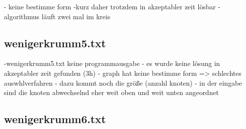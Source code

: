 \documentclass[a4paper,10pt,ngerman]{scrartcl}
\begin{document}
    - keine bestimme form
    -kurz daher trotzdem in akzeptabler zeit lösbar
    - algorithmus läuft zwei mal im kreis

    \subsection{wenigerkrumm5.txt}\label{subsec:wenigerkrumm5.txt}

    -wenigerkrumm5.txt keine programmausgabe
    - es wurde keine lösung in akzeptabler zeit gefunden (3h)
    - graph hat keine bestimme form => schlechtes auswhlverfahren
    - dazu kommt noch die größe (anzahl knoten)
    - in der eingabe sind die knoten abwechselnd eher weit oben und weit unten angeordnet

    \subsection{wenigerkrumm6.txt}\label{subsec:wenigerkrumm6.txt}
\end{document}
